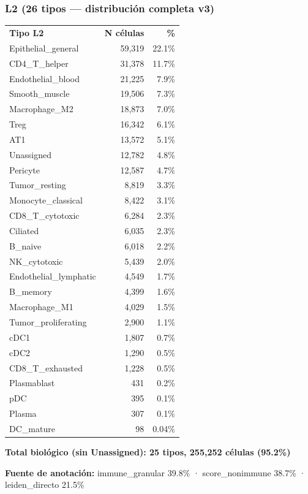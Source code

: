 \documentclass[11pt,a4paper]{article}
\begin{document}
\subsubsection{L2 (26 tipos — distribución completa v3)}
\begin{tabular}{lrr}
\rowcolor{lightgray}\textbf{Tipo L2} & \textbf{N células} & \textbf{\%} \\
Epithelial\_general & 59{,}319 & 22.1\% \\
CD4\_T\_helper & 31{,}378 & 11.7\% \\
Endothelial\_blood & 21{,}225 & 7.9\% \\
Smooth\_muscle & 19{,}506 & 7.3\% \\
Macrophage\_M2 & 18{,}873 & 7.0\% \\
Treg & 16{,}342 & 6.1\% \\
AT1 & 13{,}572 & 5.1\% \\
Unassigned & 12{,}782 & 4.8\% \\
Pericyte & 12{,}587 & 4.7\% \\
Tumor\_resting & 8{,}819 & 3.3\% \\
Monocyte\_classical & 8{,}422 & 3.1\% \\
CD8\_T\_cytotoxic & 6{,}284 & 2.3\% \\
Ciliated & 6{,}035 & 2.3\% \\
B\_naive & 6{,}018 & 2.2\% \\
NK\_cytotoxic & 5{,}439 & 2.0\% \\
Endothelial\_lymphatic & 4{,}549 & 1.7\% \\
B\_memory & 4{,}399 & 1.6\% \\
Macrophage\_M1 & 4{,}029 & 1.5\% \\
Tumor\_proliferating & 2{,}900 & 1.1\% \\
cDC1 & 1{,}807 & 0.7\% \\
cDC2 & 1{,}290 & 0.5\% \\
CD8\_T\_exhausted & 1{,}228 & 0.5\% \\
Plasmablast & 431 & 0.2\% \\
pDC & 395 & 0.1\% \\
Plasma & 307 & 0.1\% \\
DC\_mature & 98 & 0.04\% \\
\end{tabular}

\vspace{4pt}
\textbf{Total biológico (sin Unassigned): 25 tipos, 255{,}252 células (95.2\%)}

\textbf{Fuente de anotación:} immune\_granular 39.8\% · score\_nonimmune 38.7\% · leiden\_directo 21.5\%
\end{document}
